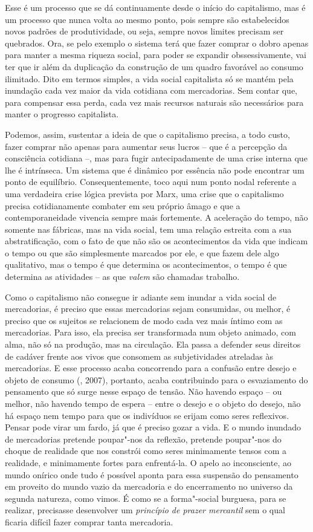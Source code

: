 Esse é um processo que se dá continuamente desde o início do
capitalismo, mas é um processo que nunca volta ao mesmo ponto, pois
sempre são estabelecidos novos padrões de produtividade, ou seja, sempre
novos limites precisam ser quebrados. Ora, se pelo exemplo o sistema
terá que fazer comprar o dobro apenas para manter a mesma riqueza
social, para poder se expandir obssessivamente, vai ter que ir além da duplicação da
construção de um quadro favorável ao consumo ilimitado. Dito em termos
simples, a vida social capitalista só se mantém pela inundação cada vez
maior da vida cotidiana com mercadorias. Sem contar que, para compensar
essa perda, cada vez mais recursos naturais são necessários para manter
o progresso capitalista.

Podemos, assim, sustentar a ideia de que o capitalismo precisa, a todo
custo, fazer comprar não apenas para aumentar seus lucros -- que é a
percepção da consciência cotidiana --, mas para fugir antecipadamente de
uma crise interna que lhe é intrínseca. Um sistema que é dinâmico por
essência não pode encontrar um ponto de equilíbrio. Consequentemente,
toco aqui num ponto nodal referente a uma verdadeira crise lógica prevista por Marx, uma
crise que o capitalismo precisa cotidianamente combater em seu próprio
âmago e que a contemporaneidade vivencia sempre mais fortemente. A
aceleração do tempo, não somente nas fábricas, mas na vida social, tem
uma relação estreita com a sua abstratificação, com o fato de que não
são os acontecimentos da vida que indicam o tempo ou que são
simplesmente marcados por ele, e que fazem dele algo qualitativo, mas o
tempo é que determina os acontecimentos, o tempo é que determina as
atividades -- as que \emph{valem} são chamadas trabalho.

Como o capitalismo não consegue ir adiante sem inundar a vida social de
mercadorias, é preciso que essas mercadorias sejam consumidas, ou
melhor, é preciso que os sujeitos se relacionem de modo cada vez mais
íntimo com as mercadorias. Para isso, ela precisa ser transformada num
objeto animado, com alma, não só na produção, mas na circulação. Ela
passa a defender seus direitos de cadáver frente aos vivos que consomem
as subjetividades atreladas às mercadorias. E esse processo acaba
concorrendo para a confusão entre desejo e objeto de consumo (,
2007), portanto, acaba contribuindo para o esvaziamento do pensamento
que só surge nesse espaço de tensão. Não havendo espaço -- ou melhor,
não havendo tempo de espera -- entre o desejo e o objeto do desejo, não
há espaço nem tempo para que os indivíduos se erijam como seres
reflexivos. Pensar pode virar um fardo, já que é preciso gozar a vida. E
o mundo inundado de mercadorias pretende poupar"-nos da reflexão,
pretende poupar"-nos do choque de realidade que nos constrói como seres
minimamente tensos com a realidade, e minimamente fortes para
enfrentá-la. O apelo ao inconsciente, ao mundo onírico onde tudo é
possível aponta para essa suspensão do pensamento em proveito do mundo
vazio da mercadoria e do encerramento no universo da segunda natureza,
como vimos. É como se a forma"-social burguesa, para se
realizar, precisasse desenvolver um \emph{princípio de prazer mercantil}
sem o qual ficaria difícil fazer comprar tanta mercadoria.


